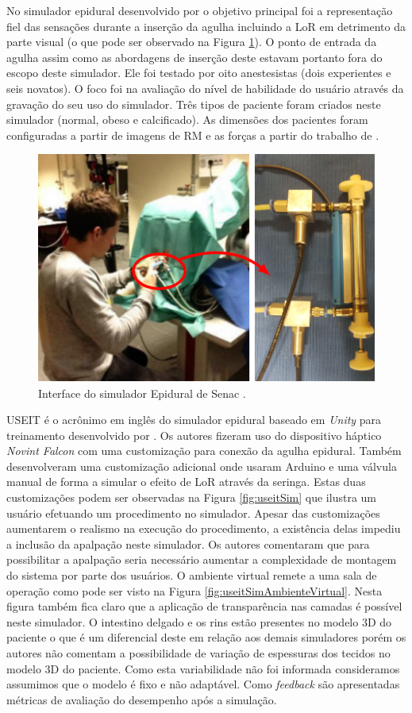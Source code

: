 No simulador epidural desenvolvido por \textcite{Senac2019} o objetivo principal foi a representação fiel das sensações durante a inserção da agulha incluindo a \acrshort{LoR} em detrimento da parte visual (o que pode ser observado na Figura \ref{fig:senacSim}). O ponto de entrada da agulha assim como as abordagens de inserção deste estavam portanto fora do escopo deste simulador. Ele foi testado por oito anestesistas (dois experientes e seis novatos). O foco foi na avaliação do nível de habilidade do usuário através da gravação do seu uso do simulador. Três tipos de paciente foram criados neste simulador (normal, obeso e calcificado). As dimensões dos pacientes foram configuradas a partir de imagens de \acrshort{RM} e as forças a partir do trabalho de \textcite{Tran2009}.

\begin{figure}[ht!]
    \centering
    \includegraphics[width=0.6\linewidth]{capitulos/figuras/Senac-ES.png} 
    \caption{Interface do simulador Epidural de Senac \cite{Senac2019}.}
    \label{fig:senacSim}
\end{figure}

USEIT é o acrônimo em inglês do simulador epidural baseado em \textit{Unity} para treinamento desenvolvido por \textcite{Moo-Young2021}. Os autores fizeram uso do dispositivo háptico \textit{Novint Falcon} com uma customização para conexão da agulha epidural. Também desenvolveram uma customização adicional onde usaram Arduino e uma válvula manual de forma a simular o efeito de \acrshort{LoR} através da seringa. Estas duas customizações podem ser observadas na Figura \ref{fig:useitSim} que ilustra um usuário efetuando um procedimento no simulador. Apesar das customizações aumentarem o realismo na execução do procedimento, a existência delas impediu a inclusão da apalpação neste simulador. Os autores comentaram que para possibilitar a apalpação seria necessário aumentar a complexidade de montagem do sistema por parte dos usuários. O ambiente virtual remete a uma sala de operação como pode ser visto na Figura \ref{fig:useitSimAmbienteVirtual}. Nesta figura também fica claro que a aplicação de transparência nas camadas é possível neste simulador. O intestino delgado e os rins estão presentes no modelo 3D do paciente o que é um diferencial deste em relação aos demais simuladores porém os autores não comentam a possibilidade de variação de espessuras dos tecidos no modelo 3D do paciente. Como esta variabilidade não foi informada consideramos assumimos que o modelo é fixo e não adaptável. Como \textit{feedback} são apresentadas métricas de avaliação do desempenho após a simulação.

